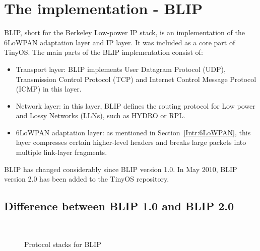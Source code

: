 \section{The implementation - BLIP}
\label{Blip}
BLIP, short for the Berkeley Low-power IP stack, is an implementation of the 6LoWPAN adaptation layer and IP layer. It was included as a core part of TinyOS. The main parts of the BLIP implementation consist of:
\begin{itemize}
\item Transport layer: BLIP implements User Datagram Protocol (UDP), Transmission Control Protocol (TCP) and Internet Control Message Protocol (ICMP) in this layer.

\item Network layer: in this layer, BLIP defines the routing protocol for Low power and Lossy Networks (LLNs), such as HYDRO or RPL.

\item 6LoWPAN adaptation layer: as mentioned in Section~\ref{Intr:6LoWPAN}, this layer compresses certain higher-level headers and breaks large packets into multiple link-layer fragments.
\end{itemize}

BLIP has changed considerably since BLIP version 1.0. In May 2010, BLIP version 2.0 has been added to the TinyOS repository.
\subsection{Difference between BLIP 1.0 and BLIP 2.0}
\label{Blip:1.0-2.0}

\begin{figure}[htbp]
  \begin{center}
    \leavevmode
    \\
    \caption{Protocol stacks for BLIP}
    \label{fig:blip}
  \end{center}
\end{figure}

